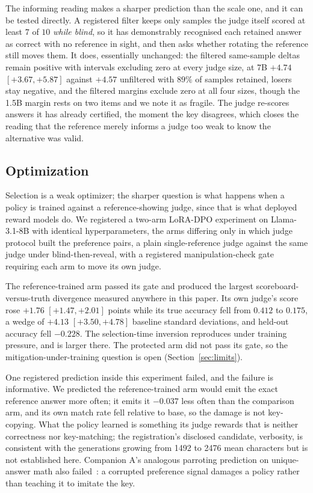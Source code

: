 \documentclass[11pt]{article}
\begin{document}
The informing reading makes a sharper prediction than the scale one, and it can be tested directly.
A registered filter keeps only samples the judge itself scored at least $7$ of $10$ \emph{while blind}, so it has demonstrably recognised each retained answer as correct with no reference in sight, and then asks whether rotating the reference still moves them.
It does, essentially unchanged: the filtered same-sample deltas remain positive with intervals excluding zero at every judge size, at 7B $+4.74$ $[+3.67, +5.87]$ against $+4.57$ unfiltered with $89\%$ of samples retained, losers stay negative, and the filtered margins exclude zero at all four sizes, though the 1.5B margin rests on two items and we note it as fragile.
The judge re-scores answers it has already certified, the moment the key disagrees, which closes the reading that the reference merely informs a judge too weak to know the alternative was valid.

\subsection{Optimization}
\label{sec:dpo}

Selection is a weak optimizer; the sharper question is what happens when a policy is trained against a reference-showing judge, since that is what deployed reward models do.
We registered a two-arm LoRA-DPO experiment on Llama-3.1-8B with identical hyperparameters, the arms differing only in which judge protocol built the preference pairs, a plain single-reference judge against the same judge under blind-then-reveal, with a registered manipulation-check gate requiring each arm to move its own judge.

The reference-trained arm passed its gate and produced the largest scoreboard-versus-truth divergence measured anywhere in this paper.
Its own judge's score rose $+1.76$ $[+1.47, +2.01]$ points while its true accuracy fell from $0.412$ to $0.175$, a wedge of $+4.13$ $[+3.50, +4.78]$ baseline standard deviations, and held-out accuracy fell $-0.228$.
The selection-time inversion reproduces under training pressure, and is larger there.
The protected arm did not pass its gate, so the mitigation-under-training question is open (Section~\ref{sec:limits}).

One registered prediction inside this experiment failed, and the failure is informative.
We predicted the reference-trained arm would emit the exact reference answer more often; it emits it $-0.037$ less often than the comparison arm, and its own match rate fell relative to base, so the damage is not key-copying.
What the policy learned is something its judge rewards that is neither correctness nor key-matching; the registration's disclosed candidate, verbosity, is consistent with the generations growing from 1492 to 2476 mean characters but is not established here.
Companion A's analogous parroting prediction on unique-answer math also failed~\cite{companionA}: a corrupted preference signal damages a policy rather than teaching it to imitate the key.
\end{document}
